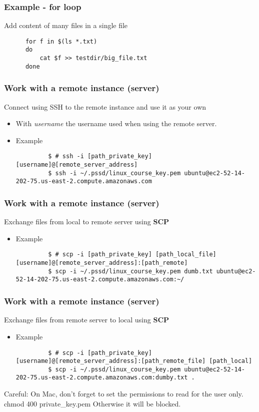 \begin{frame}[fragile]
   \frametitle{Example - for loop}
   Add content of many files in a single file
   \begin{verbatim}
      for f in $(ls *.txt)
      do
          cat $f >> testdir/big_file.txt
      done
   \end{verbatim}
\end{frame}


\begin{frame}[fragile]
   \frametitle{Work with a remote instance (server)}

   Connect using SSH to the remote instance and use it as your own
   \begin{itemize}
      \item With \textit{username} the username used when using the remote server.
      \item Example
      \begin{verbatim}
         $ # ssh -i [path_private_key] [username]@[remote_server_address]
         $ ssh -i ~/.pssd/linux_course_key.pem ubuntu@ec2-52-14-202-75.us-east-2.compute.amazonaws.com
      \end{verbatim}
   \end{itemize}
\end{frame}


\begin{frame}[fragile]
   \frametitle{Work with a remote instance (server)}

   Exchange files from local to remote server using \textbf{SCP}
   \begin{itemize}
      \item Example
      \begin{verbatim}
         $ # scp -i [path_private_key] [path_local_file] [username]@[remote_server_address]:[path_remote]
         $ scp -i ~/.pssd/linux_course_key.pem dumb.txt ubuntu@ec2-52-14-202-75.us-east-2.compute.amazonaws.com:~/
      \end{verbatim}
   \end{itemize}
\end{frame}

\begin{frame}[fragile]
   \frametitle{Work with a remote instance (server)}
   Exchange files from remote server to local using \textbf{SCP}
   \begin{itemize}
      \item Example
      \begin{verbatim}
         $ # scp -i [path_private_key] [username]@[remote_server_address]:[path_remote_file] [path_local]
         $ scp -i ~/.pssd/linux_course_key.pem ubuntu@ec2-52-14-202-75.us-east-2.compute.amazonaws.com:dumby.txt .
      \end{verbatim}
   \end{itemize}
   Careful: On Mac, don't forget to set the permissions to read for the user only. chmod 400 private\_key.pem
   Otherwise it will be blocked.
\end{frame}


